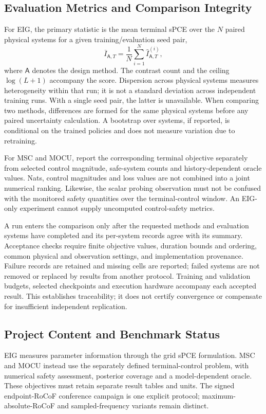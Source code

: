 \documentclass[journal]{IEEEtran}
\begin{document}
\subsection{Evaluation Metrics and Comparison Integrity}
For EIG, the primary statistic is the mean terminal sPCE over the $N$ paired
physical systems for a given training/evaluation seed pair,
\begin{equation}
\overline I_{\mathsf A,T}=\frac{1}{N}\sum_{i=1}^{N}\widehat I_{\mathsf A,T}^{(i)},
\label{eq:reported-spce}
\end{equation}
where $\mathsf A$ denotes the design method. The contrast count and the ceiling
$\log(L+1)$ accompany the score. Dispersion across physical systems measures
heterogeneity within that run; it is not a standard deviation across
independent training runs. With a single seed pair, the latter is unavailable.
When comparing two methods, differences are formed for the same physical
systems before any paired uncertainty calculation. A bootstrap over systems,
if reported, is conditional on the trained policies and does not measure
variation due to retraining.

For MSC and MOCU, report the corresponding terminal objective separately from
selected control magnitude, safe-system counts and history-dependent oracle
values. Nats, control magnitudes and loss values are not combined into a joint
numerical ranking. Likewise, the scalar probing observation must not
be confused with the monitored safety quantities over the terminal-control
window. An EIG-only experiment cannot supply uncomputed control-safety metrics.

A run enters the comparison only after the requested methods and evaluation
systems have completed and its per-system records agree with its summary.
Acceptance checks require finite objective values, duration bounds and
ordering, common physical and observation settings, and implementation
provenance. Failure records are retained and missing cells are reported;
failed systems are not removed or replaced by results from another protocol. Training and
validation budgets, selected checkpoints and execution hardware accompany
each accepted result. This establishes traceability; it does not certify
convergence or compensate for insufficient independent replication.

\subsection{Project Content and Benchmark Status}
EIG measures parameter information through the grid sPCE formulation.
MSC and MOCU instead use the separately defined terminal-control problem,
with numerical safety assessment, posterior coverage and a model-dependent
oracle. These objectives must retain separate result tables and units.
The signed endpoint-RoCoF conference campaign is one explicit protocol;
maximum-absolute-RoCoF and sampled-frequency variants remain distinct.
\end{document}
